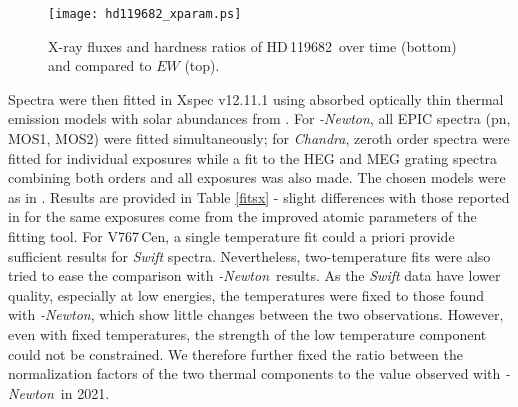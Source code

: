 \documentclass[a4paper,fleqn,usenatbib]{mnras}
\newcommand{\xmm}{{\sc{XMM}}\emph{-Newton}}
\newcommand{\hd}{HD\,119682}
\newcommand{\vc}{V767\,Cen}
\begin{document}
\begin{figure}
  \begin{center}
    \texttt{[image: hd119682\_xparam.ps]}
  \end{center}
  \caption{X-ray fluxes and hardness ratios of \hd\ over time (bottom) and compared to $EW$ (top). }
\label{xparhd}
\end{figure}

Spectra were then fitted in {\sc Xspec} v12.11.1 using absorbed optically thin thermal emission models with solar abundances from \citet{asp09}. For \xmm, all EPIC spectra (pn, MOS1, MOS2) were fitted simultaneously; for {\it Chandra}, zeroth order spectra were fitted for individual exposures while a fit to the HEG and MEG grating spectra combining both orders and all exposures was also made.  The chosen models were as in \citet{naz18}. Results are provided in Table \ref{fitsx} - slight differences with those reported in \citet{naz18} for the same exposures come from the improved atomic parameters of the fitting tool. For \vc, a single temperature fit could a priori provide sufficient results for {\it Swift} spectra. Nevertheless, two-temperature fits were also tried to ease the comparison with \xmm\ results. As the {\it Swift} data have lower quality, especially at low energies, the temperatures were fixed to those found with \xmm, which show little changes between the two observations. However, even with fixed temperatures, the strength of the low temperature component could not be constrained. We therefore further fixed the ratio between the normalization factors of the two thermal components to the value observed with \xmm\ in 2021.  
\end{document}
